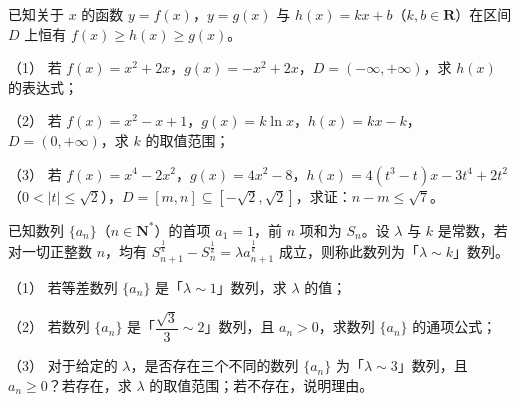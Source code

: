 \begin{question}
已知关于 $x$ 的函数 $y=f(x)$，$y=g(x)$ 与 $h(x)=kx+b$（$k,b\in\mathbf R$）在区间 $D$ 上恒有 $f(x)\geqslant h(x)\geqslant g(x)$。

（1） 若 $f(x)=x^2+2x$，$g(x)=-x^2+2x$，$D=(-\infty,+\infty)$，求 $h(x)$ 的表达式；

（2） 若 $f(x)=x^2-x+1$，$g(x)=k\ln x$，$h(x)=kx-k$，$D=(0,+\infty)$，求 $k$ 的取值范围；

（3） 若 $f(x)=x^4-2x^2$，$g(x)=4x^2-8$，$h(x)=4(t^3-t)x-3t^4+2t^2$（$0<|t|\leqslant\sqrt2$），$D=[m,n]\subseteq[-\sqrt2,\sqrt2]$，求证：$n-m\leqslant\sqrt7$。

\end{question}
\begin{question}
已知数列 $\{a_n\}$（$n\in\mathbf N^*$）的首项 $a_1=1$，前 $n$ 项和为 $S_n$。设 $\lambda$ 与 $k$ 是常数，若对一切正整数 $n$，均有 $S_{n+1}^{\frac1k}-S_n^{\frac1k}=\lambda a_{n+1}^{\frac1k}$ 成立，则称此数列为「$\lambda\sim k$」数列。

（1） 若等差数列 $\{a_n\}$ 是「$\lambda\sim1$」数列，求 $\lambda$ 的值；

（2） 若数列 $\{a_n\}$ 是「$\dfrac{\sqrt3}3\sim2$」数列，且 $a_n>0$，求数列 $\{a_n\}$ 的通项公式；

（3） 对于给定的 $\lambda$，是否存在三个不同的数列 $\{a_n\}$ 为「$\lambda\sim3$」数列，且 $a_n\geqslant0$？若存在，求 $\lambda$ 的取值范围；若不存在，说明理由。

\end{question}

